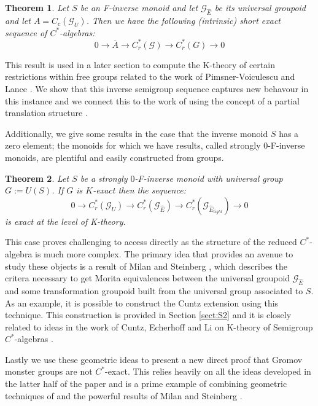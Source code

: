 \documentclass[11pt]{amsart}
\theoremstyle{plain}
\newtheorem*{thm}{Theorem}
\theoremstyle{definition}%
\theoremstyle{remark}%
\newcommand{\G}{\mathcal{G}}
\newcommand{\E}{\widehat{E}}
\begin{document}
\begin{thm}\label{thm:IT1}
Let $S$ be an F-inverse monoid and let $\G_{\E}$ be its universal groupoid and let $A=C_{c}(\G_{U})$. Then we have the following (intrinsic) short exact sequence of $C^{*}$-algebras:
\begin{equation*}
0 \rightarrow \overline{A} \rightarrow C^{*}_{r}(\mathcal{G}) \rightarrow C^{*}_{r}(G) \rightarrow 0
\end{equation*}
\end{thm}

This result is used in a later section to compute the K-theory of certain restrictions within free groups related to the work of Pimsner-Voiculescu and Lance \cite{MR670181,MR723010}. We show that this inverse semigroup sequence captures new behavour in this instance and we connect this to the work of \cite{BNW-KTA} using the concept of a partial translation structure \cite{MR2363428}.

Additionally, we give some results in the case that the inverse monoid $S$ has a zero element; the monoids for which we have results, called strongly 0-F-inverse monoids, are plentiful and easily constructed from groups.

\begin{thm}\label{thm:IT2}
Let $S$ be a strongly $0$-F-inverse monoid with universal group $G:=U(S)$. If $G$ is $K$-exact then the sequence:
\begin{equation*}
0 \rightarrow C^{*}_{r}(\G_{U}) \rightarrow C^{*}_{r}(\G_{\E}) \rightarrow C^{*}_{r}(\G_{\E_{tight}}) \rightarrow 0
\end{equation*}
is exact at the level of K-theory.  
\end{thm}

This case proves challenging to access directly as the structure of the reduced $C^{*}$-algebra is much more complex. The primary idea that provides an avenue to study these objects is a result of Milan and Steinberg \cite{Milan-Steinberg}, which describes the critera necessary to get Morita equivalences between the universal groupoid $\G_{\E}$ and some transformation groupoid built from the universal group associated to $S$. As an example, it is possible to construct the Cuntz extension using this technique. This construction is provided in Section \ref{sect:S2} and it is closely related to ideas in the work of Cuntz, Echerhoff and Li on K-theory of Semigroup $C^{*}$-algebras \cite{CEL-2}.

Lastly we use these geometric ideas to present a new direct proof that Gromov monster groups \cite{MR1978492,exrangrps} are not $C^{*}$-exact. This relies heavily on all the ideas developed in the latter half of the paper and is a prime example of combining geometric techniques of \cite{} and the powerful results of Milan and Steinberg \cite{}.
\end{document}
